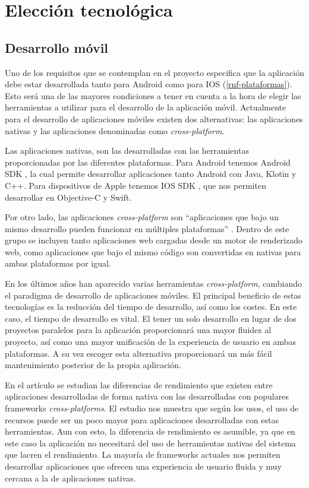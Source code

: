 \section{Elección tecnológica}

\subsection{Desarrollo móvil}

Uno de los requisitos que se contemplan en el proyecto especifica que la aplicación debe estar desarrollada tanto para Android como para IOS (\ref{rnf-plataformas}). Esto será una de las mayores condiciones a tener en cuenta a la hora de elegir las herramientas a utilizar para el desarrollo de la aplicación móvil. Actualmente para el desarrollo de aplicaciones móviles existen dos alternativas: las aplicaciones nativas y las aplicaciones denominadas como \textit{cross-platform}.

Las aplicaciones nativas, son las desarrolladas con las herramientas proporcionadas por las diferentes plataformas. Para Android tenemos Android SDK \cite{android-sdk}, la cual permite desarrollar aplicaciones tanto Android con Java, Klotin y C++. Para dispositivos de Apple tenemos IOS SDK \cite{ios-sdk}, que nos permiten desarrollar en Objective-C y Swift. 

Por otro lado, las aplicaciones \textit{cross-platform} son ``aplicaciones que bajo un mismo desarrollo pueden funcionar en múltiples plataformas'' \cite{cross-platform-comparacion}. Dentro de este grupo se incluyen tanto aplicaciones web cargadas desde un motor de renderizado web, como aplicaciones que bajo el mismo código son convertidas en nativas para ambas plataformas por igual. 

En los últimos años han aparecido varias herramientas \textit{cross-platform}, cambiando el paradigma de desarrollo de aplicaciones móviles. El principal beneficio de estas tecnologías es la reducción del tiempo de desarrollo, así como los costes. En este caso, el tiempo de desarrollo es vital. El tener un solo desarrollo en lugar de dos proyectos paralelos para la aplicación proporcionará una mayor fluidez al proyecto, así como una mayor unificación de la experiencia de usuario en ambas plataformas. A su vez escoger esta alternativa proporcionará un más fácil mantenimiento posterior de la propia aplicación. 

En el artículo \cite{cross-platform-comparacion} se estudian las diferencias de rendimiento que existen entre aplicaciones desarrolladas de forma nativa con las desarrolladas con populares frameworks \textit{cross-platforms}. El estudio nos muestra que según los usos, el uso de recursos puede ser un poco mayor para aplicaciones desarrolladas con estas herramientas. Aun con esto, la diferencia de rendimiento es asumible, ya que en este caso la aplicación no necesitará del uso de herramientas nativas del sistema que lacren el rendimiento. La mayoría de frameworks actuales nos permiten desarrollar aplicaciones que ofrecen una experiencia de usuario fluida y muy cercana a la de aplicaciones nativas.

